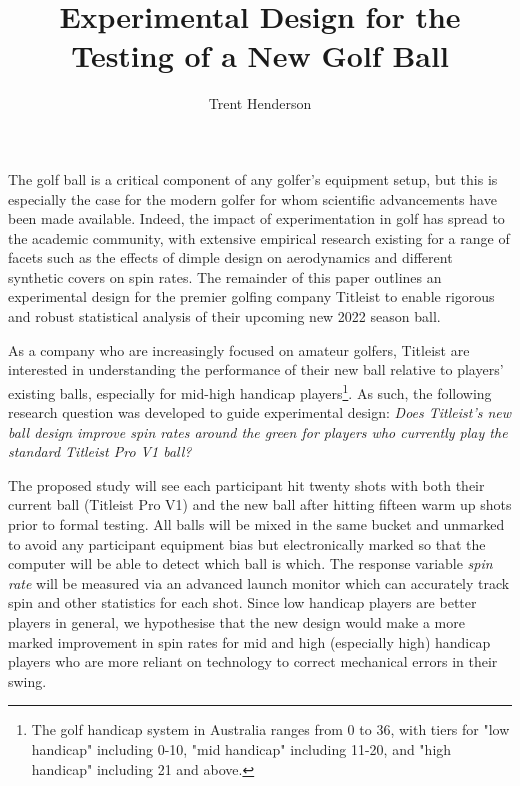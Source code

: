 \documentclass{article}
\begin{document}
\title{\vspace{-4cm}Experimental Design for the Testing of a New Golf Ball}
\author{Trent Henderson}
\date{}

\maketitle

The golf ball is a critical component of any golfer's equipment setup, but this is especially the case for the modern golfer for whom scientific advancements have been made available. 
Indeed, the impact of experimentation in golf has spread to the academic community, with extensive empirical research existing for a range of facets such as the effects of dimple design on aerodynamics and different synthetic covers on spin rates. 
The remainder of this paper outlines an experimental design for the premier golfing company Titleist to enable rigorous and robust statistical analysis of their upcoming new 2022 season ball.

As a company who are increasingly focused on amateur golfers, Titleist are interested in understanding the performance of their new ball relative to players' existing balls, especially for mid-high handicap players\footnote{The golf handicap system in Australia ranges from 0 to 36, with tiers for "low handicap" including 0-10, "mid handicap" including 11-20, and "high handicap" including 21 and above.}. 
As such, the following research question was developed to guide experimental design: \textit{Does Titleist's new ball design improve spin rates around the green for players who currently play the standard Titleist Pro V1 ball?} 

The proposed study will see each participant hit twenty shots with both their current ball (Titleist Pro V1) and the new ball after hitting fifteen warm up shots prior to formal testing. 
All balls will be mixed in the same bucket and unmarked to avoid any participant equipment bias but electronically marked so that the computer will be able to detect which ball is which.
The response variable \textit{spin rate} will be measured via an advanced launch monitor which can accurately track spin and other statistics for each shot.
Since low handicap players are better players in general, we hypothesise that the new design would make a more marked improvement in spin rates for mid and high (especially high) handicap players who are more reliant on technology to correct mechanical errors in their swing.
\end{document}
